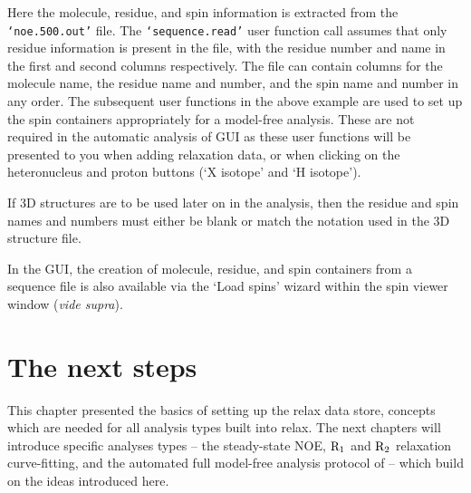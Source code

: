 Here the molecule, residue, and spin information is extracted from the \texttt{`noe.500.out'} file.  The \texttt{`sequence.read'} user function call assumes that only residue information is present in the file, with the residue number and name in the first and second columns respectively.  The file can contain columns for the molecule name, the residue name and number, and the spin name and number in any order.  The subsequent user functions in the above example are used to set up the spin containers appropriately for a model-free analysis.  These are not required in the automatic analysis of GUI as these user functions will be presented to you when adding relaxation data, or when clicking on the heteronucleus and proton buttons (`X isotope' and `H isotope').

If 3D structures are to be used later on in the analysis, then the residue and spin names and numbers must either be blank or match the notation used in the 3D structure file.

In the GUI, the creation of molecule, residue, and spin containers from a sequence file is also available via the `Load spins' wizard within the spin viewer window (\textit{vide supra}).




\section{The next steps}

This chapter presented the basics of setting up the relax data store, concepts which are needed for all analysis types built into relax.  The next chapters will introduce specific analyses types -- the steady-state NOE, $\mathrm{R}_1$ and $\mathrm{R}_2$ relaxation curve-fitting, and the automated full model-free analysis protocol of \citet{dAuvergneGooley07,dAuvergneGooley08b} -- which build on the ideas introduced here.
